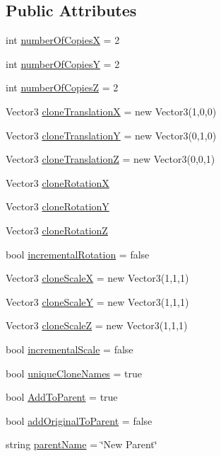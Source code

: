 \subsection*{Public Attributes}
\begin{DoxyCompactItemize}
\item 
int \hyperlink{class_smart_clone3_d_a18470eb9580165c4374ca48604d6fb5e}{number\+Of\+CopiesX} = 2
\item 
int \hyperlink{class_smart_clone3_d_a4fa0d599eba1d41fbb13a2bac4555879}{number\+Of\+CopiesY} = 2
\item 
int \hyperlink{class_smart_clone3_d_a98255258a2ddaf81997657dfb2f07bf3}{number\+Of\+CopiesZ} = 2
\item 
Vector3 \hyperlink{class_smart_clone3_d_af402e4cc65e9ea09b85721afefd45883}{clone\+TranslationX} = new Vector3(1,0,0)
\item 
Vector3 \hyperlink{class_smart_clone3_d_acedc3050524d00d823294bbb8c9a37bc}{clone\+TranslationY} = new Vector3(0,1,0)
\item 
Vector3 \hyperlink{class_smart_clone3_d_a033a2b648bccf2a83abb8187d833e146}{clone\+TranslationZ} = new Vector3(0,0,1)
\item 
Vector3 \hyperlink{class_smart_clone3_d_ae12a75c503e5b7b2f9c0ed20d4b50881}{clone\+RotationX}
\item 
Vector3 \hyperlink{class_smart_clone3_d_a448dd4b8c88f0a6bc6e7ca97d75e0b9d}{clone\+RotationY}
\item 
Vector3 \hyperlink{class_smart_clone3_d_a910674401d50bdcf427b977412950270}{clone\+RotationZ}
\item 
bool \hyperlink{class_smart_clone3_d_a9a67203d8065e6f53bf7c661219065e9}{incremental\+Rotation} = false
\item 
Vector3 \hyperlink{class_smart_clone3_d_a1025089738ae8cb73b6981e24bc4b7d8}{clone\+ScaleX} = new Vector3(1,1,1)
\item 
Vector3 \hyperlink{class_smart_clone3_d_ad6311a3c2aeb3dc0705d35a0d994eb34}{clone\+ScaleY} = new Vector3(1,1,1)
\item 
Vector3 \hyperlink{class_smart_clone3_d_ab221f63993ff0e945fca4788b52d4efa}{clone\+ScaleZ} = new Vector3(1,1,1)
\item 
bool \hyperlink{class_smart_clone3_d_adec212e4da6ebfe21a6aaf6556477ffc}{incremental\+Scale} = false
\item 
bool \hyperlink{class_smart_clone3_d_a4c7f8673f0a130f63798c3161048f94b}{unique\+Clone\+Names} = true
\item 
bool \hyperlink{class_smart_clone3_d_a1e3e1f9e529e5983bfd3995ef3ead96c}{Add\+To\+Parent} = true
\item 
bool \hyperlink{class_smart_clone3_d_a4dd5f471f954cb73c5d437dca8e8e69d}{add\+Original\+To\+Parent} = false
\item 
string \hyperlink{class_smart_clone3_d_ab9b7fe38fae95d726e25ed6301188ec4}{parent\+Name} = \char`\"{}New Parent\char`\"{}
\end{DoxyCompactItemize}


